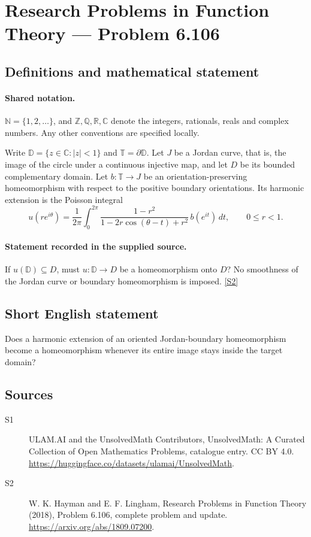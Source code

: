\documentclass[11pt]{article}
\newcommand{\sref}[2]{\hyperlink{source:#1:#2}{[S#2]}}
\begin{document}
\section{Research Problems in Function Theory — Problem 6.106}\label{statement}

\subsection{Definitions and mathematical statement}

\paragraph{Shared notation.}$\mathbb N=\{1,2,\ldots\}$, and $\mathbb Z,\mathbb Q,\mathbb R,\mathbb C$ denote the integers, rationals, reals and complex numbers. Any other conventions are specified locally.


Write $\mathbb D=\{z\in\mathbb C:|z|<1\}$ and $\mathbb T=\partial\mathbb D$. Let $J$ be a Jordan curve, that is, the image of the circle under a continuous injective map, and let $D$ be its bounded complementary domain. Let $b:\mathbb T\to J$ be an orientation-preserving homeomorphism with respect to the positive boundary orientations. Its harmonic extension is the Poisson integral
\[u(re^{i\theta})=\frac1{2\pi}\int_0^{2\pi}
\frac{1-r^2}{1-2r\cos(\theta-t)+r^2}\,b(e^{it})\,dt,\qquad0\leq r<1.\]
\paragraph{Statement recorded in the supplied source.}
If $u(\mathbb D)\subseteq D$, must $u:\mathbb D\to D$ be a homeomorphism onto $D$? No smoothness of the Jordan curve or boundary homeomorphism is imposed. \sref{statement}{2}
\subsection{Short English statement}
Does a harmonic extension of an oriented Jordan-boundary homeomorphism become a homeomorphism whenever its entire image stays inside the target domain?
\subsection{Sources}
\begin{description}
\item[\hypertarget{source:statement:1}{S1}] ULAM.AI and the UnsolvedMath Contributors, UnsolvedMath: A Curated Collection of Open Mathematics Problems, catalogue entry. CC BY 4.0. \url{https://huggingface.co/datasets/ulamai/UnsolvedMath}.
\item[\hypertarget{source:statement:2}{S2}] W. K. Hayman and E. F. Lingham, Research Problems in Function Theory (2018), Problem 6.106, complete problem and update. \url{https://arxiv.org/abs/1809.07200}.
\end{description}
\label{end:statement}
\end{document}
